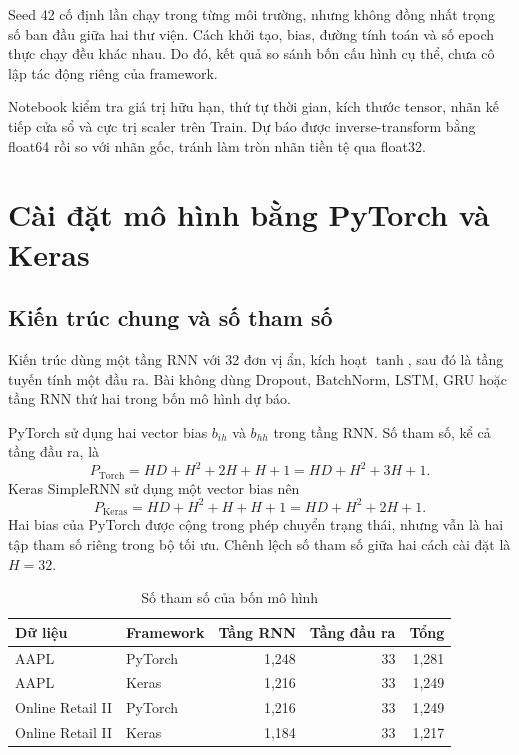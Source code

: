 \documentclass[12pt,a4paper]{report}
\begin{document}
Seed 42 cố định lần chạy trong từng môi trường, nhưng không đồng nhất trọng số ban đầu giữa hai thư viện. Cách khởi tạo, bias, đường tính toán và số epoch thực chạy đều khác nhau. Do đó, kết quả so sánh bốn cấu hình cụ thể, chưa cô lập tác động riêng của framework.

Notebook kiểm tra giá trị hữu hạn, thứ tự thời gian, kích thước tensor, nhãn kế tiếp cửa sổ và cực trị scaler trên Train. Dự báo được inverse-transform bằng float64 rồi so với nhãn gốc, tránh làm tròn nhãn tiền tệ qua float32.

\chapter{Cài đặt mô hình bằng PyTorch và Keras}
\label{chap:implementation}

\section{Kiến trúc chung và số tham số}
Kiến trúc dùng một tầng RNN với 32 đơn vị ẩn, kích hoạt $\tanh$, sau đó là tầng tuyến tính một đầu ra. Bài không dùng Dropout, BatchNorm, LSTM, GRU hoặc tầng RNN thứ hai trong bốn mô hình dự báo.

PyTorch sử dụng hai vector bias $b_{ih}$ và $b_{hh}$ trong tầng RNN. Số tham số, kể cả tầng đầu ra, là
\begin{equation}
P_{\mathrm{Torch}}=HD+H^2+2H+H+1=HD+H^2+3H+1.
\end{equation}
Keras SimpleRNN sử dụng một vector bias nên
\begin{equation}
P_{\mathrm{Keras}}=HD+H^2+H+H+1=HD+H^2+2H+1.
\end{equation}
Hai bias của PyTorch được cộng trong phép chuyển trạng thái, nhưng vẫn là hai tập tham số riêng trong bộ tối ưu. Chênh lệch số tham số giữa hai cách cài đặt là $H=32$.

\begin{table}[H]\centering\small
\caption{Số tham số của bốn mô hình}\label{tab:parameter-count}
\begin{tabular}{@{}llrrr@{}}\toprule
Dữ liệu & Framework & Tầng RNN & Tầng đầu ra & Tổng \\\midrule
AAPL & PyTorch & 1,248 & 33 & 1,281 \\
AAPL & Keras & 1,216 & 33 & 1,249 \\
Online Retail II & PyTorch & 1,216 & 33 & 1,249 \\
Online Retail II & Keras & 1,184 & 33 & 1,217 \\\bottomrule
\end{tabular}
\end{table}
\end{document}
